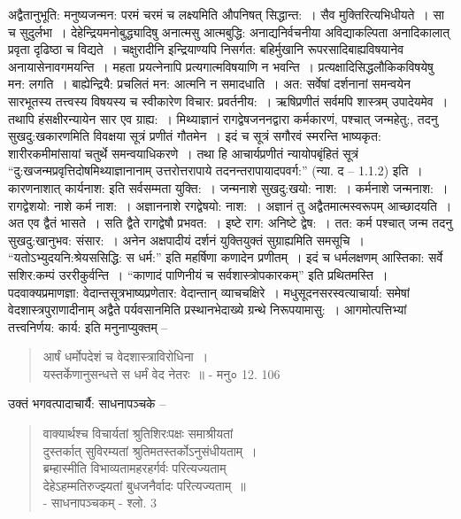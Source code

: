 {अद्वैतानुभूति: मनुष्यजन्मन: परमं चरमं च लक्ष्यमिति औपनिषत् सिद्धान्त:~। सैव मुक्तिरित्यभिधीयते~। सा च सुदुर्लभा~। देहेन्द्रियमनोबुद्ध्यादिषु अनात्मसु आत्मबुद्धि: अनाद्यनिर्वचनीया अविद्याकल्पिता अनादिकालात् प्रवृता दृढिष्ठा च विद्यते~। चक्षुरादीनि इन्द्रियाण्यपि निसर्गत: बहिर्मुखानि रूपरसादिबाह्यविषयानेव अनायासेनावगमयन्ति~। महता प्रयत्नेनापि प्रत्यगात्मविषयाणि न भवन्ति~। प्रत्यक्षादिसिद्धलौकिकविषयेषु मन: लगति~। बाह्येन्द्रियै: प्रचलितं मन: आत्मनि न समादधाति~। अत: सर्वेषां दर्शनानां समन्वयेन सारभूतस्य तत्त्वस्य विषयस्य च स्वीकारेण विचार: प्रवर्तनीय:~। ऋषिप्रणीतं सर्वमपि शास्त्रम् उपादेयमेव~। तथापि हंसक्षीरन्यायेन सार एव ग्राह्य:~। मिथ्याज्ञानं रागद्वेषजननद्वारा कर्मकारणं, पश्चात् जन्महेतु:, तदनु सुखदु:खकारणमिति विवक्षया सूत्रं प्रणीतं गौतमेन~। इदं च सूत्रं सगौरवं स्मरन्ति भाष्यकृत: शारीरकमीमांसायां चतुर्थे समन्वयाधिकरणे~। तथा हि आचार्यप्रणीतं न्यायोपबृंहितं सूत्रं “दु:खजन्मप्रवृत्तिदोषमिथ्याज्ञानानाम् उत्तरोत्तरापाये तदनन्तरापायादपवर्ग:” (न्या. द – 1.1.2) इति~। कारणनाशात् कार्यनाश: इति सर्वसम्मता युक्ति:~। जन्मनाशे सुखदु:खयो: नाश:~। कर्मनाशे जन्मनाश:~। रागद्वेशयो: नाशे कर्म नाश:~। अज्ञाननाशे रगद्वेषयो: नाश:~। अज्ञानं तु अद्वैतमात्मस्वरूपम् आच्छादयति~। अत एव द्वैतं भासते~। सति द्वैते रागद्वेषौ प्रभवत:~। इष्टे राग: अनिष्टे द्वेष:~। तत: कर्म पश्चात् जन्म तदनु सुखदु:खानुभव: संसार:~। अनेन अक्षपादीयं दर्शनं युक्तियुक्तं सुग्राह्यमिति समसूचि~। “यतोऽभ्युदयनि:श्रेयससिद्धि: स धर्म:” इति महर्षिणा कणादेन प्रणीतम्~। इदं च धर्मलक्षणम् आस्तिका: सर्वे सशिर:कम्पं उररीकुर्वन्ति~। “काणादं पाणिनीयं च सर्वशास्त्रोपकारकम्” इति प्रथितमस्ति~। पदवाक्यप्रमाणज्ञा: वेदान्तसूत्रभाष्यप्रणेतार: वेदान्तान् व्याचचक्षिरे~। मधुसूदनसरस्वत्याचार्या: समेषां वेदशास्त्रपुराणादीनाम् अद्वैते पर्यवसानमिति प्रस्थानभेदाख्ये ग्रन्थे निरूपयामासु:~। आगमोत्पत्तिभ्यां तत्त्वनिर्णय: कार्य: इति मनुनाप्युक्तम् –
\begin{verse}
आर्षं धर्मोपदेशं च वेदशास्त्राविरोधिना~। \\
यस्तर्केणानुसन्धत्ते स धर्मं वेद नेतरः~॥ - मनु० 12. 106
\end{verse}
उक्तं भगवत्पादाचार्यै: साधनापञ्चके –
\begin{verse}
वाक्यार्थश्च विचार्यतां श्रुतिशिरःपक्षः समाश्रीयतां\\
दुस्तर्कात् सुविरम्यतां श्रुतिमतस्तर्कोऽनुसंधीयताम्~। \\  
ब्रम्हास्मीति विभाव्यतामहरहर्गर्वः परित्यज्यताम्\\  
देहेऽहम्मतिरुज्झ्यतां बुधजनैर्वादः परित्यज्यताम्~॥\\
\hspace{5cm} - साधनापञ्चकम् - श्लो. 3
\end{verse}
}
